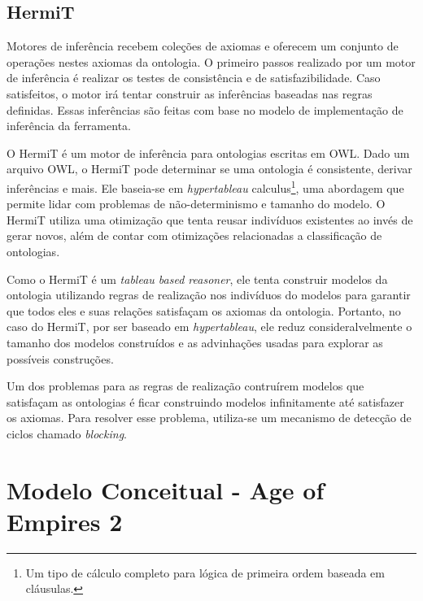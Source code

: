 \documentclass[10pt,a4paper]{article}
\begin{document}

\subsection{HermiT}

Motores de inferência recebem coleções de axiomas e oferecem um conjunto de operações
nestes axiomas da ontologia. O primeiro passos realizado por um motor de inferência é realizar os testes de consistência e de satisfazibilidade. Caso satisfeitos, o motor irá tentar construir as inferências baseadas nas regras definidas. Essas inferências são feitas com base no modelo de implementação de inferência da ferramenta.

O HermiT é um motor de inferência para ontologias escritas em OWL. Dado um arquivo OWL, o HermiT pode determinar se uma ontologia é consistente, derivar inferências e mais. Ele baseia-se em \emph{hypertableau} calculus\footnote{Um tipo de cálculo completo para lógica de primeira ordem baseada em cláusulas.}, uma abordagem que permite lidar com problemas de
não-determinismo e tamanho do modelo. O HermiT utiliza uma otimização que tenta reusar
indivíduos existentes ao invés de gerar novos, além de contar com otimizações relacionadas a classificação de ontologias.

Como o HermiT é um \emph{tableau based reasoner}, ele tenta construir modelos da ontologia utilizando regras de realização nos indivíduos do modelos para garantir que todos eles e suas relações satisfaçam os axiomas da ontologia. Portanto, no caso do HermiT, por ser baseado em \emph{hypertableau}, ele reduz consideralvelmente o tamanho dos modelos construídos e as advinhações usadas para explorar as possíveis construções.

Um dos problemas para as regras de realização contruírem modelos que satisfaçam as
ontologias é ficar construindo modelos infinitamente até satisfazer os axiomas. Para resolver esse problema, utiliza-se um mecanismo de detecção de ciclos chamado \emph{blocking}.



\section{Modelo Conceitual - Age of Empires 2}
\end{document}
